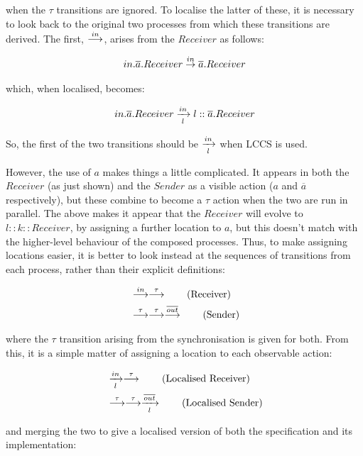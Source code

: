 \noindent when the $\tau$ transitions are ignored.  To localise the
latter of these, it is necessary to look back to the original two
processes from which these transitions are derived.  The first,
$\stackrel{in}{\longrightarrow}$, arises from the $Receiver$ as follows:

\begin{equation}
in.\overline{a}.Receiver \stackrel{in}{\rightarrow} \overline{a}.Receiver
\end{equation}

\noindent which, when localised, becomes:

\begin{equation}
in.\overline{a}.Receiver \xrightarrow[l]{in} l::\overline{a}.Receiver
\end{equation}

\noindent So, the first of the two transitions should be
$\xrightarrow[l]{in}$ when LCCS is used.

However, the use of $a$ makes things a little complicated.  It appears
in both the $Receiver$ (as just shown) and the $Sender$ as a visible
action ($a$ and $\overline{a}$ respectively), but these combine to
become a $\tau$ action when the two are run in parallel.  The above
makes it appear that the $Receiver$ will evolve to $l::k::Receiver$, by
assigning a further location to $a$, but this doesn't match with the
higher-level behaviour of the composed processes.  Thus, to make
assigning locations easier, it is better to look instead at the
sequences of transitions from each process, rather than their explicit
definitions:

\begin{align}
& \stackrel{in}{\longrightarrow} \stackrel{\tau}{\longrightarrow} \tag{Receiver} \\
& \stackrel{\tau}{\longrightarrow} \stackrel{\tau}{\longrightarrow} \stackrel{\overline{out}}{\longrightarrow} \tag{Sender}
\end{align}

\noindent where the $\tau$ transition arising from the synchronisation
is given for both.  From this, it is a simple matter of assigning a
location to each observable action:

\begin{align}
& \xrightarrow[l]{in} \stackrel{\tau}{\longrightarrow} \tag{Localised Receiver} \\
& \stackrel{\tau}{\longrightarrow} \stackrel{\tau}{\longrightarrow} \xrightarrow[l]{\overline{out}}
\tag{Localised Sender}
\end{align}

\noindent and merging the two to give a localised version of both the
specification and its implementation:

